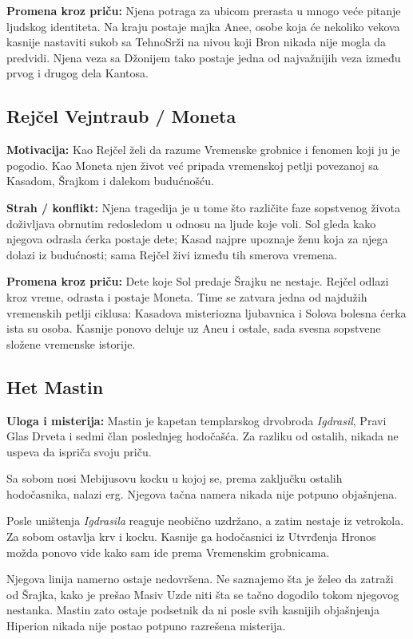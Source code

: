 \textbf{Promena kroz priču:} Njena potraga za ubicom prerasta u mnogo veće pitanje ljudskog identiteta. Na kraju postaje majka Anee, osobe koja će nekoliko vekova kasnije nastaviti sukob sa TehnoSrži na nivou koji Bron nikada nije mogla da predvidi. Njena veza sa Džonijem tako postaje jedna od najvažnijih veza između prvog i drugog dela Kantosa.


\subsection*{Rejčel Vejntraub / Moneta}

\textbf{Motivacija:} Kao Rejčel želi da razume Vremenske grobnice i fenomen koji ju je pogodio. Kao Moneta njen život već pripada vremenskoj petlji povezanoj sa Kasadom, Šrajkom i dalekom budućnošću.

\textbf{Strah / konflikt:} Njena tragedija je u tome što različite faze sopstvenog života doživljava obrnutim redosledom u odnosu na ljude koje voli. Sol gleda kako njegova odrasla ćerka postaje dete; Kasad najpre upoznaje ženu koja za njega dolazi iz budućnosti; sama Rejčel živi između tih smerova vremena.

\textbf{Promena kroz priču:} Dete koje Sol predaje Šrajku ne nestaje. Rejčel odlazi kroz vreme, odrasta i postaje Moneta. Time se zatvara jedna od najdužih vremenskih petlji ciklusa: Kasadova misteriozna ljubavnica i Solova bolesna ćerka ista su osoba. Kasnije ponovo deluje uz Aneu i ostale, sada svesna sopstvene složene vremenske istorije.


\subsection*{Het Mastin}

\textbf{Uloga i misterija:} Mastin je kapetan templarskog drvobroda \emph{Igdrasil}, Pravi Glas Drveta i sedmi član poslednjeg hodočašća. Za razliku od ostalih, nikada ne uspeva da ispriča svoju priču.

Sa sobom nosi Mebijusovu kocku u kojoj se, prema zaključku ostalih hodočasnika, nalazi erg. Njegova tačna namera nikada nije potpuno objašnjena.

Posle uništenja \emph{Igdrasila} reaguje neobično uzdržano, a zatim nestaje iz vetrokola. Za sobom ostavlja krv i kocku. Kasnije ga hodočasnici iz Utvrđenja Hronos možda ponovo vide kako sam ide prema Vremenskim grobnicama.

Njegova linija namerno ostaje nedovršena. Ne saznajemo šta je želeo da zatraži od Šrajka, kako je prešao Masiv Uzde niti šta se tačno dogodilo tokom njegovog nestanka. Mastin zato ostaje podsetnik da ni posle svih kasnijih objašnjenja Hiperion nikada nije postao potpuno razrešena misterija.


